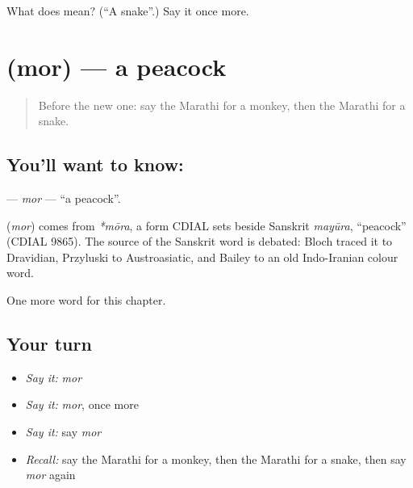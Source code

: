 \begin{tcolorbox}[breakable,colback=teal!4,colframe=teal!35!black,title={Before you move on}]
What does  mean? (\textquotedblleft{}A snake\textquotedblright{}.) Say it once more.
\end{tcolorbox}
\section[\texorpdfstring{\mr{मोर} (mor)}{मोर (mor)}]{ (mor) — a peacock}

\label{lesson:MR-C102-mor}



\begin{quote}
Before the new one: say the Marathi for a monkey, then the Marathi for a snake.
\end{quote}

\subsection*{You'll want to know: }
\textbf{} — \emph{mor} — \textquotedblleft{}a peacock\textquotedblright{}.

\begin{cousinweb}
\textbf{} (\emph{mor}) comes from \emph{*mōra}, a form CDIAL sets beside Sanskrit \emph{mayūra}, \textquotedblleft{}peacock\textquotedblright{} (CDIAL 9865). The source of the Sanskrit word is debated: Bloch traced it to Dravidian, Przyluski to Austroasiatic, and Bailey to an old Indo-Iranian colour word.
\end{cousinweb}

\begin{grammarlens}[title={What you've built}]
One more word for this chapter.
\end{grammarlens}

\subsection*{Your turn}
\begin{itemize}
\raggedright
  \item \emph{Say it:} \emph{mor}
  \item \emph{Say it:} \emph{mor}, once more
  \item \emph{Say it:} say \emph{mor}
  \item \emph{Recall:} say the Marathi for a monkey, then the Marathi for a snake, then say \emph{mor} again
\end{itemize}

